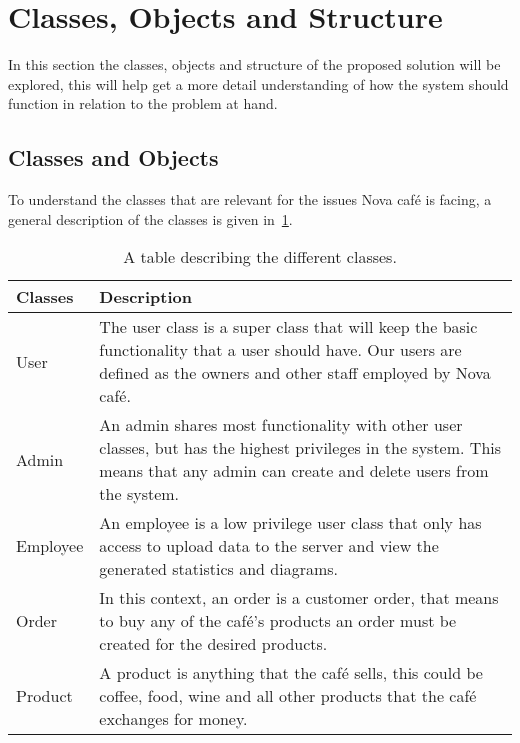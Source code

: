 \section{Classes, Objects and Structure}\label{sec:classes-objects-and-structure}

In this section the classes, objects and structure of the proposed solution will be explored, this
will help get a more detail understanding of how the system should function in relation to the problem at hand.


\subsection{Classes and Objects}\label{subsec:classes-and-objects}
To understand the classes that are relevant for the issues Nova café is facing,
a general description of the classes is given in~\ref{tab:class-table}.

\begin{table}[h]
    \begin{tabular} { m{2.5cm} m{10cm} }
        \toprule
        \textbf{Classes} & \textbf{Description} \\
        \midrule
        User & The user class is a super class that will keep the
        basic functionality that a user should have.
        Our users are defined as the owners and other staff employed by Nova café. \\
        \midrule
        Admin & An admin shares most functionality with other user classes,
        but has the highest privileges in the system.
        This means that any admin can create and delete users from the system. \\
        \midrule
        Employee & An employee is a low privilege user class
        that only has access to upload data to the server and
        view the generated statistics and diagrams. \\
        \midrule
        Order & In this context, an order is a customer order,
        that means to buy any of the café's products an order must be created
        for the desired products. \\
        \midrule
        Product & A product is anything that the café sells,
        this could be coffee, food, wine and all other products that
        the café exchanges for money. \\
        \bottomrule
    \end{tabular}
    \caption{A table describing the different classes.}\label{tab:class-table}
\end{table}

